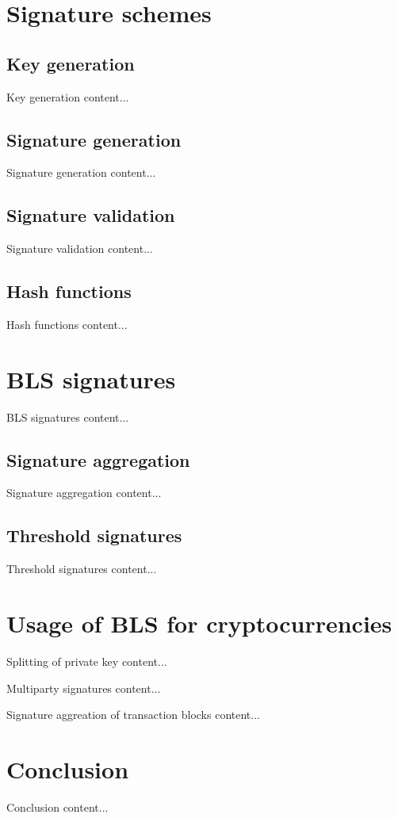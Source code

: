 \documentclass{beamer}
\begin{document}
\section{Signature schemes}
\subsection{Key generation}
\begin{frame}{Key generation}
	content...
\end{frame}
\subsection{Signature generation}
\begin{frame}{Signature generation}
	content...
\end{frame}
\subsection{Signature validation}
\begin{frame}{Signature validation}
	content...
\end{frame}
\subsection{Hash functions}
\begin{frame}{Hash functions}
	content...
\end{frame}
\section{BLS signatures}
\begin{frame}{BLS signatures}
	content...
\end{frame}
\subsection{Signature aggregation}
\begin{frame}{Signature aggregation}
	content...
\end{frame}
\subsection{Threshold signatures}
\begin{frame}{Threshold signatures}
	content...
\end{frame}
\section{Usage of BLS for cryptocurrencies}
\begin{frame}{Splitting of private key}
	content...
\end{frame}
\begin{frame}{Multiparty signatures}
	content...
\end{frame}
\begin{frame}{Signature aggreation of transaction blocks}
	content...
\end{frame}
\section{Conclusion}
\begin{frame}{Conclusion}
	content...
\end{frame}
\end{document}
